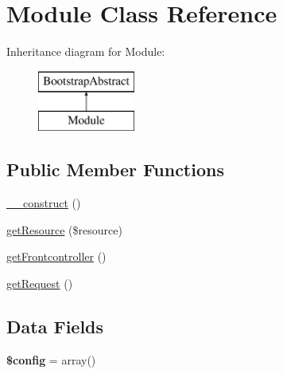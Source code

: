 \hypertarget{class_anemo_1_1_application_1_1_bootstrap_1_1_module}{
\section{Module Class Reference}
\label{class_anemo_1_1_application_1_1_bootstrap_1_1_module}
}
Inheritance diagram for Module:\begin{figure}[H]
\begin{center}
\leavevmode
\includegraphics[height=2.000000cm]{class_anemo_1_1_application_1_1_bootstrap_1_1_module}
\end{center}
\end{figure}
\subsection*{Public Member Functions}
\begin{DoxyCompactItemize}
\item 
\hyperlink{class_anemo_1_1_application_1_1_bootstrap_1_1_module_a095c5d389db211932136b53f25f39685}{\_\-\_\-construct} ()
\item 
\hyperlink{class_anemo_1_1_application_1_1_bootstrap_1_1_module_aa2c1b8634bea77c8eb6a7d909511bd52}{getResource} (\$resource)
\item 
\hyperlink{class_anemo_1_1_application_1_1_bootstrap_1_1_module_aa182525e446da02ad9af5d903f3f8f66}{getFrontcontroller} ()
\item 
\hyperlink{class_anemo_1_1_application_1_1_bootstrap_1_1_module_adf1a35ad20e475c59cc0967d5764aa22}{getRequest} ()
\end{DoxyCompactItemize}
\subsection*{Data Fields}
\begin{DoxyCompactItemize}
\item 
\hypertarget{class_anemo_1_1_application_1_1_bootstrap_1_1_module_a49c7011be9c979d9174c52a8b83e5d8e}{
{\bfseries \$config} = array()}
\label{class_anemo_1_1_application_1_1_bootstrap_1_1_module_a49c7011be9c979d9174c52a8b83e5d8e}

\end{DoxyCompactItemize}
